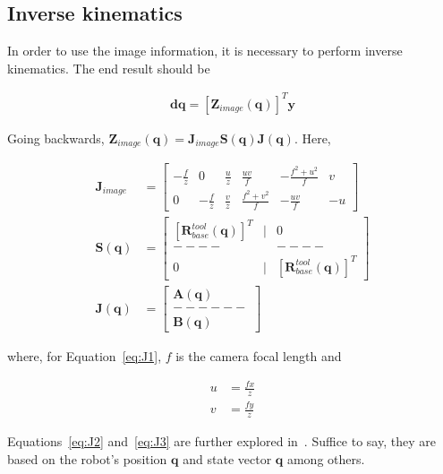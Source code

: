 \subsection{Inverse kinematics}
In order to use the image information, it is necessary to perform inverse kinematics.
The end result should be

\begin{align}
\mathrm{\textbf{dq}}=\left[\textbf{Z}_\mathit{image}(\textbf{q})\right]^T\textbf{y} %
\end{align}

Going backwards, $\textbf{Z}_\mathit{image}(\textbf{q}) = \textbf{J}_\mathit{image}\textbf{S}(\textbf{q})\textbf{J}(\textbf{q})$. Here,

\begin{align}
    \textbf{J}_\mathit{image}&=
    \left[
        \begin{matrix}
            -\frac{f}{z} & 0            & \frac{u}{z} & \frac{uv}{f}      & -\frac{f^2+u^2}{f} & v \\
            0            & -\frac{f}{z} & \frac{v}{z} & \frac{f^2+v^2}{f} & -\frac{uv}{f}      & -u
        \end{matrix}
    \right]\label{eq:J1}\\
    \textbf{S}(\textbf{q})&=\left[
    \begin{matrix}
        \left[\textbf{R}_\mathit{base}^\mathit{tool}(\textbf{q})\right]^T & | & 0 \\ %
        -- -- & & -- -- \\
        0 & | & \left[\textbf{R}_\mathit{base}^\mathit{tool}(\textbf{q})\right]^T %
    \end{matrix}
    \right]\label{eq:J2}\\
    \textbf{J}(\textbf{q})&=\left[
    \begin{matrix}
        \textbf{A}(\textbf{q})\\
        ------\\
        \textbf{B}(\textbf{q})
    \end{matrix}
    \right]\label{eq:J3}
\end{align}

where, for Equation~\ref{eq:J1}, $f$ is the camera focal length and

\begin{align}
u &= \frac{fx}{z}\nonumber \\
v &= \frac{fy}{z}
\end{align}

Equations~\ref{eq:J2} and~\ref{eq:J3} are further explored in~\cite{robbook}.
Suffice to say, they are based on the robot's position $\textbf{q}$ and state vector $\textbf{q}$ among others.
